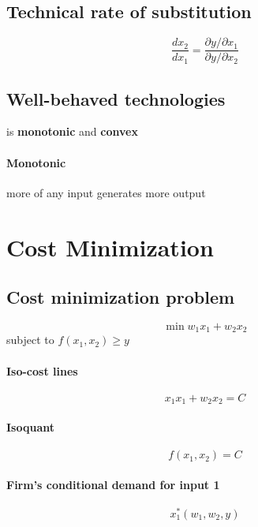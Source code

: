 \documentclass[a4paper] {scrartcl}
\begin{document}
\subsection{Technical rate of substitution}
\begin{equation}
	\frac{dx_2}{dx_1} = \frac{\partial y/\partial x_1}{\partial y/\partial x_2}
\end{equation}

\subsection{Well-behaved technologies}
is \textbf{monotonic} and \textbf{convex}

\paragraph{Monotonic} %
\label{par:monotonic}
more of any input generates more output

\section{Cost Minimization}
\subsection{Cost minimization problem}
\begin{equation}
	\min w_1x_1+w_2x_2
\end{equation}
subject to $f(x_1,x_2)\geq y$

\paragraph{Iso-cost lines} %
\label{par:iso_cost_lines}
\begin{equation}
	x_1x_1+w_2x_2 = C
\end{equation}


\paragraph{Isoquant} %
\label{par:isoquant}
\begin{equation}
	f(x_1,x_2)=C
\end{equation}


\paragraph{Firm's conditional demand for input 1} %
\label{par:firm_s_conditional_demand_for_input_1}
\begin{equation}
	x_1^*(w_1, w_2, y)
\end{equation}
\end{document}

